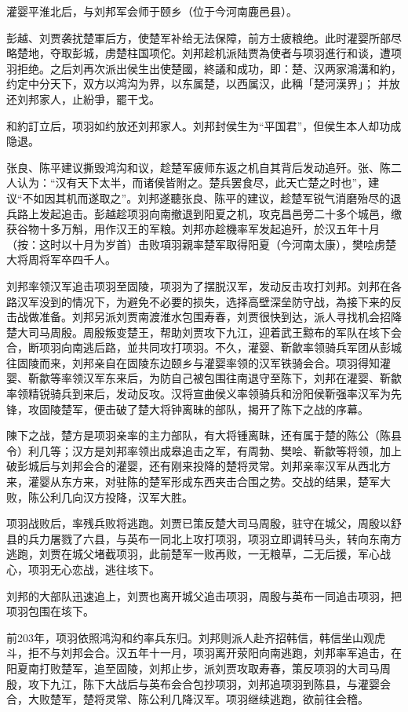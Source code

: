 灌婴平淮北后，与刘邦军会师于颐乡（位于今河南鹿邑县）。

彭越、刘贾袭扰楚軍后方，使楚军补给无法保障，前方士疲粮绝。此时灌婴所部尽略楚地，夺取彭城，虏楚柱国项佗。刘邦趁机派陆贾為使者与项羽進行和谈，遭项羽拒绝。之后刘再次派出侯生出使楚國，終議和成功，即：楚、汉两家鴻溝和約，约定中分天下，双方以鸿沟为界，以东属楚，以西属汉，此稱「楚河漢界」； 并放还刘邦家人，止紛爭，罷干戈。

和約訂立后，项羽如约放还刘邦家人。刘邦封侯生为“平国君”，但侯生本人却功成隐退。

张良、陈平建议撕毁鸿沟和议，趁楚军疲师东返之机自其背后发动追歼。张、陈二人认为：“汉有天下太半，而诸侯皆附之。楚兵罢食尽，此天亡楚之时也”，建议“不如因其机而遂取之”。刘邦遂聽张良、陈平的建议，趁楚军锐气消磨殆尽的退兵路上发起追击。彭越趁项羽向南撤退到阳夏之机，攻克昌邑旁二十多个城邑，缴获谷物十多万斛，用作汉王的军粮。刘邦亦趁機率军发起追歼，於汉五年十月（按：这时以十月为岁首）击败項羽親率楚军取得阳夏（今河南太康），樊哙虏楚大将周将军卒四千人。

刘邦率领汉军追击项羽至固陵，项羽为了摆脱汉军，发动反击攻打刘邦。刘邦在各路汉军没到的情况下，为避免不必要的损失，选择高壁深垒防守战，為接下来的反击战做准备。刘邦另派刘贾南渡淮水包围寿春，刘贾很快到达，派人寻找机会招降楚大司马周殷。周殷叛变楚王，帮助刘贾攻下九江，迎着武王黥布的军队在垓下会合，断项羽向南逃后路，並共同攻打项羽。不久，灌婴、靳歙率领骑兵军团从彭城往固陵而来，刘邦亲自在固陵东边颐乡与灌婴率领的汉军铁骑会合。项羽得知灌婴、靳歙等率领汉军东来后，为防自己被包围往南退守至陈下，刘邦在灌婴、靳歙率领精锐骑兵到来后，发动反攻。汉将宣曲侯义率领骑兵和汾阳侯靳强率汉军为先锋，攻固陵楚军，便击破了楚大将钟离昧的部队，揭开了陈下之战的序幕。

陳下之战，楚方是项羽亲率的主力部队，有大将锺离眜，还有属于楚的陈公（陈县令）利几等；汉方是刘邦率领出成皋追击之军，有周勃、樊哙、靳歙等将领，加上破彭城后与刘邦会合的灌婴，还有刚来投降的楚将灵常。刘邦亲率汉军从西北方来，灌婴从东方来，对驻陈的楚军形成东西夹击合围之势。交战的结果，楚军大败，陈公利几向汉方投降，汉军大胜。

项羽战败后，率残兵败将逃跑。刘贾已策反楚大司马周殷，驻守在城父，周殷以舒县的兵力屠戮了六县，与英布一同北上攻打项羽，项羽立即调转马头，转向东南方逃跑，刘贾在城父堵截项羽，此前楚军一败再败，一无粮草，二无后援，军心战心，项羽无心恋战，逃往垓下。

刘邦的大部队迅速追上，刘贾也离开城父追击项羽，周殷与英布一同追击项羽，把项羽包围在垓下。

前203年，项羽依照鸿沟和约率兵东归。刘邦则派人赴齐招韩信，韩信坐山观虎斗，拒不与刘邦会合。汉五年十一月，项羽离开荥阳向南逃跑，刘邦率军追击，在阳夏南打败楚军，追至固陵，刘邦止步，派刘贾攻取寿春，策反项羽的大司马周殷，攻下九江，陈下大战后与英布会合包抄项羽，刘邦追项羽到陈县，与灌婴会合，大败楚军，楚将灵常、陈公利几降汉军。项羽继续逃跑，欲前往会稽。

